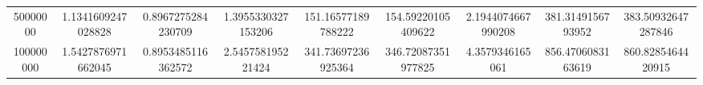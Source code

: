 \begin{table}[ht]
\begin{tabular}{@{}SSSSSSSSS@{}}
        50000000 & 1.1341609247028828 & 0.8967275284230709 & 1.3955330327153206 & 151.16577189788222 & 154.59220105409622 & 2.1944074667990208 & 381.3149156793952 & 383.50932647287846 \\
        100000000 & 1.5427876971662045 & 0.8953485116362572 & 2.545758195221424 & 341.73697236925364 & 346.72087351977825 & 4.3579346165061 & 856.4706083163619 & 860.8285464420915 \\
        \bottomrule
    \end{tabular}\label{table:efficiency_parquet-60percent_small-tables}
\end{table}